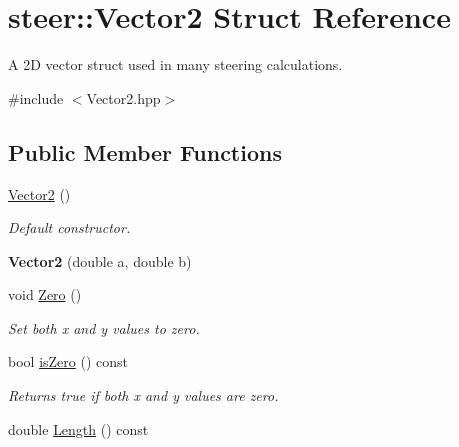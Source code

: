 \hypertarget{structsteer_1_1_vector2}{\section{steer\-:\-:Vector2 Struct Reference}
\label{structsteer_1_1_vector2}
}


A 2\-D vector struct used in many steering calculations.  




{\ttfamily \#include $<$Vector2.\-hpp$>$}

\subsection*{Public Member Functions}
\begin{DoxyCompactItemize}
\item 
\hypertarget{structsteer_1_1_vector2_a6a933cf0f06bfd06c87504afadb2fb1f}{\hyperlink{structsteer_1_1_vector2_a6a933cf0f06bfd06c87504afadb2fb1f}{Vector2} ()}\label{structsteer_1_1_vector2_a6a933cf0f06bfd06c87504afadb2fb1f}

\begin{DoxyCompactList}\small\item\em Default constructor. \end{DoxyCompactList}\item 
\hypertarget{structsteer_1_1_vector2_a9a52d06e412d058cd153d39ce2f4f8e6}{{\bfseries Vector2} (double a, double b)}\label{structsteer_1_1_vector2_a9a52d06e412d058cd153d39ce2f4f8e6}

\item 
\hypertarget{structsteer_1_1_vector2_acfdeb77fde9e5ff5b4d4382cedae7c37}{void \hyperlink{structsteer_1_1_vector2_acfdeb77fde9e5ff5b4d4382cedae7c37}{Zero} ()}\label{structsteer_1_1_vector2_acfdeb77fde9e5ff5b4d4382cedae7c37}

\begin{DoxyCompactList}\small\item\em Set both x and y values to zero. \end{DoxyCompactList}\item 
\hypertarget{structsteer_1_1_vector2_ac566f4b8db067347553e267e52124360}{bool \hyperlink{structsteer_1_1_vector2_ac566f4b8db067347553e267e52124360}{is\-Zero} () const }\label{structsteer_1_1_vector2_ac566f4b8db067347553e267e52124360}

\begin{DoxyCompactList}\small\item\em Returns true if both x and y values are zero. \end{DoxyCompactList}\item 
\hypertarget{structsteer_1_1_vector2_abd9e9306146a4ac7b26bb3b10a438d73}{double \hyperlink{structsteer_1_1_vector2_abd9e9306146a4ac7b26bb3b10a438d73}{Length} () const }\label{structsteer_1_1_vector2_abd9e9306146a4ac7b26bb3b10a438d73}


\end{DoxyCompactItemize}
